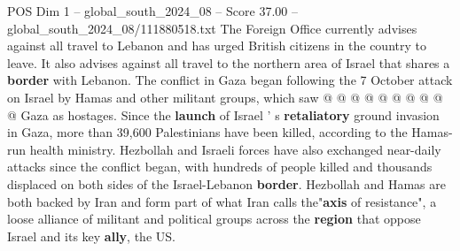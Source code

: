 \begin{textsample}{POS Dim 1 – global\_south\_2024\_08 – Score 37.00 – global\_south\_2024\_08/111880518.txt}
The Foreign Office currently advises against all travel to Lebanon and has urged British citizens in the country to leave.
It also advises against all travel to the northern area of Israel that shares a \textbf{border} with Lebanon.
The conflict in Gaza began following the 7 October attack on Israel by Hamas and other militant groups, which saw @ @ @ @ @ @ @ @ @ @ Gaza as hostages.
Since the \textbf{launch} of Israel ' s \textbf{retaliatory} ground invasion in Gaza, more than 39,600 Palestinians have been killed, according to the Hamas-run health ministry.
Hezbollah and Israeli forces have also exchanged near-daily attacks since the conflict began, with hundreds of people killed and thousands displaced on both sides of the Israel-Lebanon \textbf{border}.
Hezbollah and Hamas are both backed by Iran and form part of what Iran calls the"\textbf{axis} of resistance", a loose alliance of militant and political groups across the \textbf{region} that oppose Israel and its key \textbf{ally}, the US.

\end{textsample}
